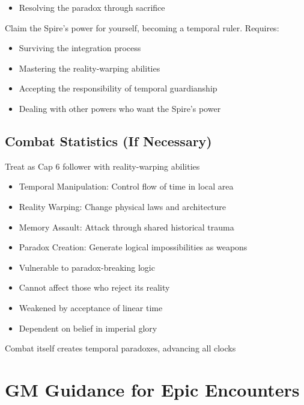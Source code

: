 \documentclass[11pt]{article}
\begin{document}
\begin{description}[leftmargin=*]
\begin{itemize}
\item Resolving the paradox through sacrifice
\end{itemize}
\item[The Conquest] Claim the Spire's power for yourself, becoming a temporal ruler. Requires:
\begin{itemize}
\item Surviving the integration process
\item Mastering the reality-warping abilities
\item Accepting the responsibility of temporal guardianship
\item Dealing with other powers who want the Spire's power
\end{itemize}
\end{description}

\subsection*{Combat Statistics (If Necessary)}

\begin{description}[leftmargin=*]
\item[Scale] Treat as Cap 6 follower with reality-warping abilities
\item[Special Abilities]
\begin{itemize}
\item Temporal Manipulation: Control flow of time in local area
\item Reality Warping: Change physical laws and architecture
\item Memory Assault: Attack through shared historical trauma
\item Paradox Creation: Generate logical impossibilities as weapons
\end{itemize}
\item[Weaknesses]
\begin{itemize}
\item Vulnerable to paradox-breaking logic
\item Cannot affect those who reject its reality
\item Weakened by acceptance of linear time
\item Dependent on belief in imperial glory
\end{itemize}
\item[Consequences] Combat itself creates temporal paradoxes, advancing all clocks
\end{description}

\section*{GM Guidance for Epic Encounters}
\end{document}
